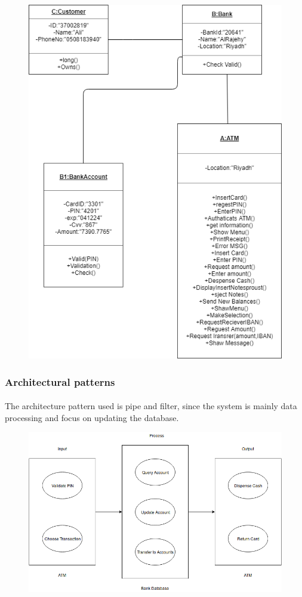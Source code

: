 \documentclass{article}
\begin{document}
		\begin{figure}[h!]
			\begin{center}
				\includegraphics[height=\linewidth]{img/object.png}
			\end{center}
		\end{figure}
	\newpage\subsubsection{Architectural patterns}
		\paragraph{} The architecture pattern used is pipe and filter, since the system is mainly data processing and focus on updating the database.
		\begin{figure}[h!]
			\begin{center}
				\includegraphics[width=\linewidth]{img/architecture.png}
			\end{center}
		\end{figure}


	\newpage
	
	
\end{document}

